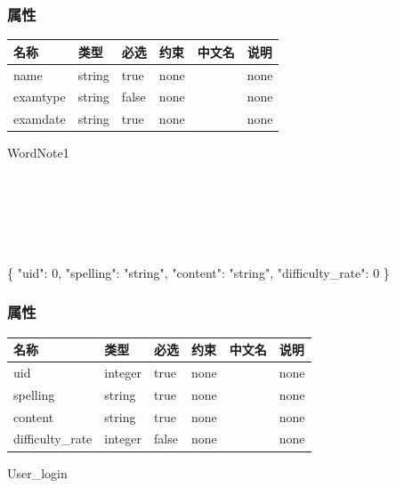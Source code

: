 \documentclass[
]{article}
\newenvironment{Shaded}{}{}
\newcommand{\DataTypeTok}[1]{\textcolor[rgb]{0.56,0.13,0.00}{#1}}
\newcommand{\DecValTok}[1]{\textcolor[rgb]{0.25,0.63,0.44}{#1}}
\newcommand{\FunctionTok}[1]{\textcolor[rgb]{0.02,0.16,0.49}{#1}}
\newcommand{\StringTok}[1]{\textcolor[rgb]{0.25,0.44,0.63}{#1}}
\begin{document}
\hypertarget{ux5c5eux6027-11}{%
\subsubsection{属性}\label{ux5c5eux6027-11}}

\begin{longtable}[]{@{}llllll@{}}
\toprule
名称 & 类型 & 必选 & 约束 & 中文名 & 说明 \\
\midrule
\endhead
name & string & true & none & & none \\
examtype & string & false & none & & none \\
examdate & string & true & none & & none \\
\bottomrule
\end{longtable}

WordNote1

\strut \\
\strut \\
\strut \\

\begin{Shaded}
\begin{Highlighting}[]
\FunctionTok{\{}
  \DataTypeTok{"uid"}\FunctionTok{:} \DecValTok{0}\FunctionTok{,}
  \DataTypeTok{"spelling"}\FunctionTok{:} \StringTok{"string"}\FunctionTok{,}
  \DataTypeTok{"content"}\FunctionTok{:} \StringTok{"string"}\FunctionTok{,}
  \DataTypeTok{"difficulty\_rate"}\FunctionTok{:} \DecValTok{0}
\FunctionTok{\}}
\end{Highlighting}
\end{Shaded}

\hypertarget{ux5c5eux6027-12}{%
\subsubsection{属性}\label{ux5c5eux6027-12}}

\begin{longtable}[]{@{}llllll@{}}
\toprule
名称 & 类型 & 必选 & 约束 & 中文名 & 说明 \\
\midrule
\endhead
uid & integer & true & none & & none \\
spelling & string & true & none & & none \\
content & string & true & none & & none \\
difficulty\_rate & integer & false & none & & none \\
\bottomrule
\end{longtable}

User\_login
\end{document}
